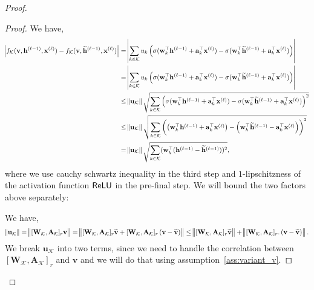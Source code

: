 \begin{proof}
\begin{proof}
		
		We have,
		\begingroup \allowdisplaybreaks
		\begin{align*}
			\abs{f_{\mathcal{K}}(\mathbf{v}, \mathbf{h}^{(\ell-1)}, \mathbf{x}^{(\ell)}) - f_{\mathcal{K}}(\mathbf{v}, \widetilde{\mathbf{h}}^{(\ell-1)}, \mathbf{x}^{(\ell)}) }  
			&=  \abs{\sum_{k \in \mathcal{K}} u_k \left(\sigma(\mathbf{w}_k^{\top} \mathbf{h}^{(\ell-1)} + \mathbf{a}_k^{\top} \mathbf{x}^{(\ell)}) - \sigma(\mathbf{w}_k^{\top} \widetilde{\mathbf{h}}^{(\ell-1)} + \mathbf{a}_k^{\top} \mathbf{x}^{(\ell)}) \right)} \\  
			&=  \abs{\sum_{k \in \mathcal{K}}  u_k \left(\sigma(\mathbf{w}_k^{\top} \mathbf{h}^{(\ell-1)} + \mathbf{a}_k^{\top} \mathbf{x}^{(\ell)}) - \sigma(\mathbf{w}_k^{\top} \widetilde{\mathbf{h}}^{(\ell-1)} + \mathbf{a}_k^{\top} \mathbf{x}^{(\ell)}) \right) } \\
			&\le \norm{\mathbf{u}_{\mathcal{K}}} \sqrt{\sum_{k \in \mathcal{K}} \left(\sigma(\mathbf{w}_k^{\top} \mathbf{h}^{(\ell-1)} + \mathbf{a}_k^{\top} \mathbf{x}^{(\ell)}) - \sigma(\mathbf{w}_k^{\top} \widetilde{\mathbf{h}}^{(\ell-1)} + \mathbf{a}_k^{\top} \mathbf{x}^{(\ell)}) \right)^2} \\
			&\le  \norm{\mathbf{u}_{\mathcal{K}}} \sqrt{\sum_{k \in \mathcal{K}} \left(\left(\mathbf{w}_k^{\top} \mathbf{h}^{(\ell-1)} + \mathbf{a}_k^{\top} \mathbf{x}^{(\ell)}\right) - \left(\mathbf{w}_k^{\top} \widetilde{\mathbf{h}}^{(\ell-1)} - \mathbf{a}_k^{\top} \mathbf{x}^{(\ell)}\right) \right)^2} \\
			&=  \norm{\mathbf{u}_{\mathcal{K}}} \sqrt{\sum_{k \in \mathcal{K}} (\mathbf{w}_k^{\top} (\mathbf{h}^{(\ell-1)} - \widetilde{\mathbf{h}}^{(\ell-1)}))^2}, 
		\end{align*}
		\endgroup
		where we use cauchy schwartz inequality in the third step and $1$-lipschitzness of the activation function $\mathsf{ReLU}$ in the pre-final step.
		We will bound the two factors above separately: %
		
		We have,
		\begin{align}
			\norm{\mathbf{u}_{\mathcal{K}}} = \norm{[\mathbf{W}_{\mathcal{K}}, \mathbf{A}_{\mathcal{K}}]_r \mathbf{v}} = \norm{[\mathbf{W}_{\mathcal{K}}, \mathbf{A}_{\mathcal{K}}]_r \widetilde{\mathbf{v}} + [\mathbf{W}_{\mathcal{K}}, \mathbf{A}_{\mathcal{K}}]_r \left(\mathbf{v} - \widetilde{\mathbf{v}}\right)} \le \norm{[\mathbf{W}_{\mathcal{K}}, \mathbf{A}_{\mathcal{K}}]_r \widetilde{\mathbf{v}}} + \norm{[\mathbf{W}_{\mathcal{K}}, \mathbf{A}_{\mathcal{K}}]_r. \left(\mathbf{v} - \widetilde{\mathbf{v}}\right)} .\label{eq:uK}
		\end{align}
		We break $\mathbf{u}_{\mathcal{K}}$ into two terms, since we need to handle the correlation between $[\mathbf{W}_{\mathcal{K}}, \mathbf{A}_{\mathcal{K}}]_r$ and $\mathbf{v}$ and we will do that using assumption~\ref{ass:variant_v}.
		

\end{proof}
\end{proof}
